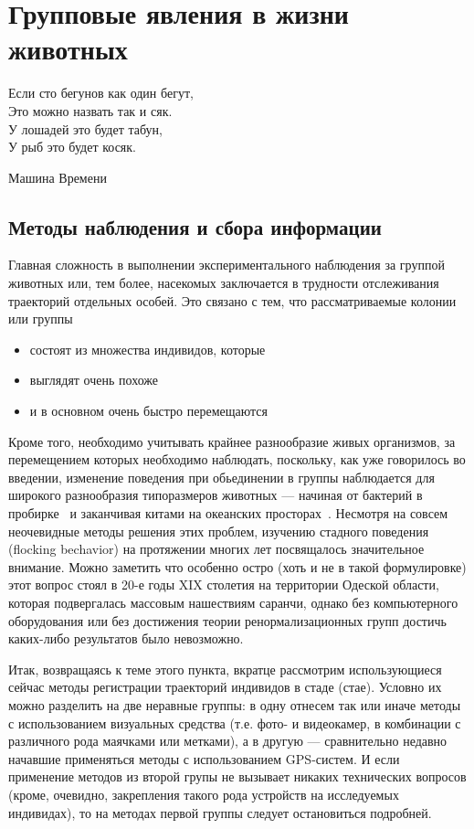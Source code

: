 \section{Групповые явления в жизни животных} %
\label{sec:AnimalFlocking}
\epigraph{Если сто бегунов как один бегут,\\
Это можно назвать так и сяк.\\
У лошадей это будет табун,\\
У рыб это будет косяк.}{Машина Времени}
	\subsection{Методы наблюдения и сбора информации} %
	\label{sub:ExperimentalMethods}
	Главная сложность в выполнении экспериментального наблюдения за группой животных или, тем более, насекомых заключается в трудности отслеживания траекторий отдельных особей. Это связано с тем, что рассматриваемые колонии или группы
	\begin{itemize}
		\item  состоят из множества индивидов, которые
		\item выглядят очень похоже
		\item и в основном очень быстро перемещаются
	\end{itemize}
	Кроме того, необходимо учитывать крайнее разнообразие живых организмов, за перемещением которых необходимо наблюдать, поскольку, как уже говорилось во введении, изменение поведения при обьединении в группы наблюдается для широкого разнообразия типоразмеров животных --- начиная от бактерий в пробирке~\cite{csahok1997,keller1971} и заканчивая китами на океанских просторах~\cite{makris2009}.
	Несмотря на совсем неочевидные методы решения этих проблем, изучению стадного поведения (flocking bechavior) на протяжении многих лет посвящалось значительное внимание. Можно заметить что особенно остро (хоть и не в такой формулировке) этот вопрос стоял в 20-е годы XIX столетия на территории Одеской области, которая подвергалась массовым нашествиям саранчи, однако без компьютерного оборудования или без достижения теории ренормализационных групп достичь каких-либо результатов было невозможно.

	Итак, возвращаясь к теме этого пункта, вкратце рассмотрим использующиеся сейчас методы регистрации траекторий индивидов в стаде (стае). Условно их можно разделить на две неравные группы: в одну отнесем так или иначе методы с использованием визуальных средства (т.е. фото- и видеокамер, в комбинации с различного рода маячками или метками), а в другую --- сравнительно недавно начавшие применяться методы с использованием GPS-систем. И если применение методов из второй групы не вызывает никаких технических вопросов (кроме, очевидно, закрепления такого рода устройств на исследуемых индивидах), то на методах первой группы следует остановиться подробней.

